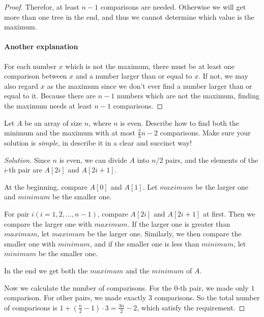 \begin{proof}
    Therefor, at least $n - 1$ comparisons are needed. Otherwise we will get more than one tree in the end, and thus we cannot determine which value is the maximum.
    
    \paragraph{Another explanation}
    \label{anotherExplanation}
    For each number $x$ which is not the maximum, there must be at least one comparison between $x$ and a number larger than or equal to $x$. If not, we may also regard $x$ as the maximum since we don't ever find a number larger than or equal to it. Because there are $n - 1$ numbers which are not the maximum, finding the maximum needs at least $n - 1$ comparisons.
\end{proof}

\newpage

\begin{thm}{}{}
    Let $A$ be an array of size $n$, where $n$ is even. Describe how to find both the minimum and the maximum with at most $\frac{2}{3}n - 2$ comparisons. Make sure your solution is \textit{simple}, in describe it in a clear and succinct way!
\end{thm}

\begin{proof}[Solution]
    Since $n$ is even, we can divide $A$ into $n / 2$ pairs, and the elements of the $i$-th pair are $A[2i]$ and $A[2i + 1]$.
    
    At the beginning, compare $A[0]$ and $A[1]$. Let $maximum$ be the larger one and $minimum$ be the smaller one.
    
    For pair $i(i = 1, 2, \ldots, n - 1)$, compare $A[2i]$ and $A[2i + 1]$ at first. Then we compare the larger one with $maximum$. If the larger one is greater than $maximum$, let $maximum$ be the larger one. Similarly, we then compare the smaller one with $minimum$, and if the smaller one is less than $minimum$, let $minimum$ be the smaller one.
    
    In the end we get both the $maximum$ and the $minimum$ of $A$.
    
    Now we calculate the number of comparisons. For the $0$-th pair, we made only $1$ comparison. For other pairs, we made exactly $3$ comparisons. So the total number of comparisons is $1 + (\frac{n}{2} - 1) \cdot 3 = \frac{3n}{2} - 2$, which satisfy the requirement.
\end{proof}

